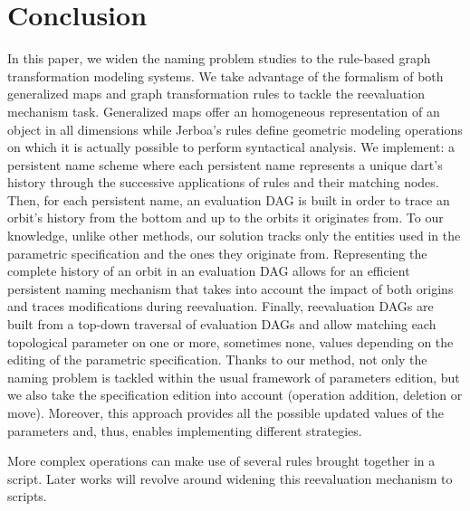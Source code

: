 \section{Conclusion}


In this paper, we widen the naming problem studies to the rule-based graph transformation modeling systems. %
We take advantage of the formalism of both generalized maps and graph transformation rules  to tackle the reevaluation mechanism task. %
Ge\-ne\-ra\-li\-zed maps offer an homogeneous representation of an object in all
dimensions while Jerboa's rules %
define
geometric
modeling o\-pe\-ra\-tions on which it is actually possible to perform syntactical
a\-na\-ly\-sis. %
We implement: a persistent name scheme where each persistent name represents a unique
dart's history through the successive %
applications of rules
and their matching nodes.
Then, for each per\-sis\-tent name, an evaluation DAG
is built in order to trace an orbit's history from the bottom and up to the
orbits it originates from. %
To our knowledge, unlike other methods, our solution tracks only the entities used in the parametric specification and the ones they o\-ri\-gi\-na\-te from.
Representing the complete history of an orbit in an e\-va\-lua\-tion DAG allows for an
efficient persistent naming mechanism that takes into account the impact of both
origins and traces mo\-di\-fi\-ca\-tions during reevaluation. %
Finally, reevaluation DAGs are built from a top-down traversal of evaluation DAGs and
allow matching each topological parameter on one or more,  sometimes none, va\-lues depending on the editing of the parametric specification. %
Thanks to our method,
not only the naming problem is tackled within the usual framework of parameters edition, but we also take the spe\-ci\-fi\-ca\-tion edition into account (operation addition, deletion or move).
Moreover, this approach provides all the possible updated values of the parameters and, thus, enables implementing different strategies.

More complex operations can make use of several rules
brought together
in a script. %
Later works will revolve around widening this reevaluation mechanism
to scripts. %

